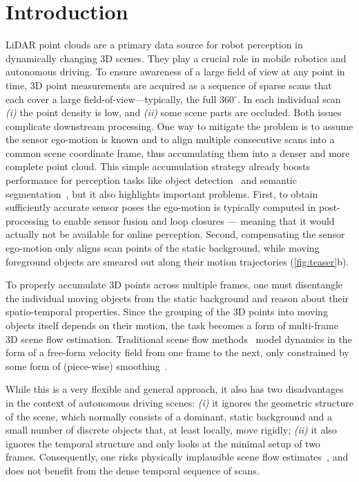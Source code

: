 \section{Introduction}
\label{sec:intro}
LiDAR point clouds are a primary data source for robot perception in dynamically changing 3D scenes. They play a crucial role in mobile robotics and autonomous driving.
To ensure awareness of a large field of view at any point in time, 3D point measurements are acquired as a sequence of sparse scans that each cover a large field-of-view---typically, the full 360$^\circ$.
In each individual scan \emph{(i)} the point density is low, and \emph{(ii)} some scene parts are occluded. Both issues complicate downstream processing.
One way to mitigate the problem is to assume the sensor ego-motion is known and to align multiple consecutive scans into a common scene coordinate frame, thus accumulating them into a denser and more complete point cloud.
This simple accumulation strategy already boosts performance for perception tasks like object detection~\cite{caesar2020nuscenes} and semantic segmentation~\cite{behley2019semantickitti}, but it also highlights important problems.
First, to obtain sufficiently accurate sensor poses the ego-motion is typically computed in post-processing to enable sensor fusion and loop closures --- meaning 
that it would actually not be available for online perception. Second, compensating the sensor ego-motion 
only aligns scan points of the static background, while moving foreground objects are smeared out along their motion trajectories (\cref{fig:teaser}b). 

To properly accumulate 3D points across multiple frames, one must disentangle the individual moving objects from the static background and reason about their spatio-temporal properties. Since the grouping of the 3D points into moving objects itself depends on their motion, the task becomes a form of multi-frame 3D scene flow estimation. Traditional scene flow methods~\cite{liu2019flownet3d,wu2019pointpwc,puy2020flot} model dynamics in the form of a free-form velocity field from one frame to the next, only constrained by some form of (piece-wise) smoothing~\cite{vogel2013piecewise,vogel20153d,dewan2016rigid}.

While this is a very flexible and general approach, it also has two disadvantages in the context of autonomous driving scenes: \emph{(i)} it ignores the geometric structure of the scene, which normally consists of a dominant, static background and a small number of discrete objects that, at least locally, move rigidly;
\emph{(ii)} it also ignores the temporal structure and only looks at the minimal setup of two frames. Consequently, one risks physically implausible scene flow estimates~\cite{gojcic2021weakly}, and does not benefit from the dense temporal sequence of scans.

